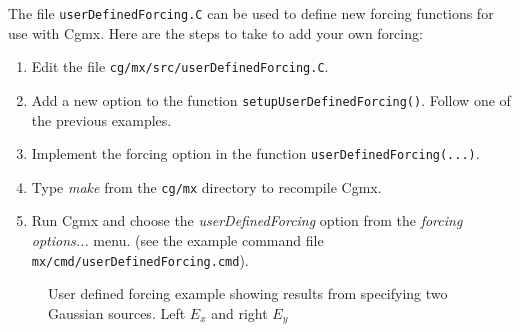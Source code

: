 The file {\tt userDefinedForcing.C} can be used to define new forcing functions
for use with Cgmx. Here are the steps to take to add your own forcing:
\begin{enumerate}
  \item Edit the file  {\tt cg/mx/src/userDefinedForcing.C}.
  \item Add a new option to the function {\tt setupUserDefinedForcing()}. Follow one of the previous
         examples. 
  \item Implement the forcing option in the function {\tt userDefinedForcing(...)}.
  \item Type {\em make} from the {\tt cg/mx} directory to recompile Cgmx.
  \item Run Cgmx and choose the {\em userDefinedForcing} option from the {\em forcing options...} menu.
    (see the example command file {\tt mx/cmd/userDefinedForcing.cmd}).
\end{enumerate}

{
\begin{figure}[hbt]
\newcommand{\figWidth}{7.5cm}
\newcommand{\trimfig}[2]{\trimFig{#1}{#2}{0.1}{0.05}{.05}{.05}}
\begin{center}
\end{center}
\caption{User defined forcing example showing results from specifying two Gaussian sources. Left $E_x$ and right $E_y$}
\label{fig:userDefinedForcingGuassianSources}
\end{figure}
}

